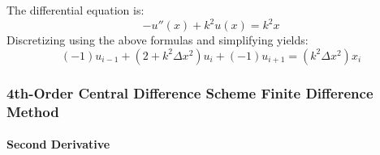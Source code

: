 \documentclass[10pt]{article}		%
\numberwithin{equation}{section}
\begin{document}
The differential equation is:
\begin{equation}
-u''(x)+k^2u(x)=k^2x
\end{equation}
Discretizing using the above formulas and simplifying yields:
\begin{equation}
\left(-1\right) u_{i-1} + \left(2 + k^2\Delta x^2\right) u_{i} + \left(-1\right) u_{i+1} = \left(k^2\Delta x^2 \right)x_i
\end{equation}

\subsubsection{4th-Order Central Difference Scheme Finite Difference Method}

\paragraph{Second Derivative}
\end{document}
